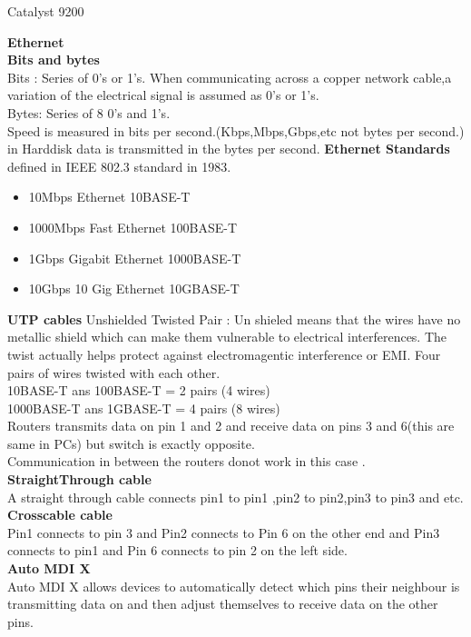 \documentclass{report}
\begin{document}
	\begin{itemize}
	Catalyst 9200 
	\end{itemize}
	\textbf{Ethernet}\\ \textbf{Bits and bytes}\\ Bits : Series of 0's or 1's. When
	communicating across a copper network cable,a variation of the electrical signal
	is assumed as 0's or 1's. \\ Bytes: Series of 8 0's and 1's. \\ Speed is
	measured in bits per second.(Kbps,Mbps,Gbps,etc not bytes per second.) in Harddisk
	data is transmitted in the bytes per second. \textbf{Ethernet Standards}\\
	defined in IEEE 802.3 standard in 1983.
	\begin{itemize}
		\item 10Mbps Ethernet 10BASE-T\\

		\item 1000Mbps Fast Ethernet 100BASE-T\\

		\item 1Gbps Gigabit Ethernet 1000BASE-T\\

		\item 10Gbps 10 Gig Ethernet 10GBASE-T\\
	\end{itemize}
	\textbf{UTP cables } Unshielded Twisted Pair : Un shieled means that the wires
	have no metallic shield which can make them vulnerable to electrical interferences.
	The twist actually helps protect against electromagentic interference or EMI. Four
	pairs of wires twisted with each other.\\ 10BASE-T ans 100BASE-T = 2 pairs (4
	wires)\\ 1000BASE-T ans 1GBASE-T = 4 pairs (8 wires)\\ Routers transmits data on
	pin 1 and 2 and receive data on pins 3 and 6(this are same in PCs) but switch
	is exactly opposite.\\ Communication in between the routers donot work in this
	case .\\ \textbf{StraightThrough cable}\\ A straight through cable connects pin1
	to pin1 ,pin2 to pin2,pin3 to pin3 and etc.\\ \textbf{Crosscable cable}\\ Pin1
	connects to pin 3 and Pin2 connects to Pin 6 on the other end and Pin3
	connects to pin1 and Pin 6 connects to pin 2 on the left side.\\ \textbf{Auto
	MDI X}\\ Auto MDI X allows devices to automatically detect which pins their
	neighbour is transmitting data on and then adjust themselves to receive data
	on the other pins.\\
\end{document}
